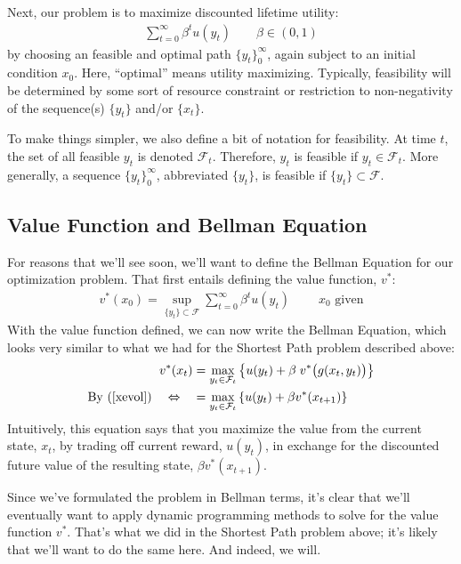 \documentclass[a4paper,12pt]{scrartcl}
\begin{document}
Next, our problem is to maximize discounted lifetime utility: 
\begin{align}
  \label{toughproblem}
  \sum^\infty_{t=0} \beta^t u(y_t)
  \qquad \beta\in (0,1)
\end{align}
by choosing an feasible and optimal path $\{ y_t \}_0^\infty$, again
subject to an initial condition $x_0$.  Here,
``optimal'' means utility maximizing. Typically, feasibility
will be determined by some sort of resource constraint or
restriction to non-negativity of the sequence(s) $\{ y_t \}$
and/or $\{x_t\}$. 

To make things simpler, we also define a bit of notation for
feasibility. At time $t$, the set of all feasible $y_t$ is denoted
$\mathcal{F}_t$. Therefore, $y_t$ is feasible if $y_t\in
\mathcal{F}_t$. More generally, a sequence $\{y_t\}^\infty_0$,
abbreviated $\{y_t\}$, is feasible if $\{y_t\} \subset \mathcal{F}$.


\subsection{Value Function and Bellman Equation}

For reasons that we'll see soon, we'll want to define the Bellman
Equation for our optimization problem. That first entails
defining the value function, $v^*$: 
\begin{align*}
  v^*(x_0) = \sup_{ \{y_t\} \subset \mathcal{F}}
  \sum^\infty_{t=0} \beta^t u(y_t)\; 
  \qquad
  \text{$x_0$ given}
\end{align*}
With the value function defined, we can now write the Bellman
Equation, which looks very similar to what we had for the Shortest
Path problem described above:
\begin{align}
  v^*(x_t) &= \max_{y_t \in \mathcal{F}_t} 
  \left\{ u(y_t) + \beta \; v^*\big(g(x_t, y_t)\big) \right\} \\
    \text{By (\ref{xevol})} \quad \Leftrightarrow \quad 
  &= \max_{y_t \in \mathcal{F}_t} 
    \left\{ u(y_t) + \beta v^*(x_{t+1}) \right\} \notag
\end{align}
Intuitively, this equation says that you maximize the value from the
current state, $x_t$, by trading off current reward, $u(y_t)$, in
exchange for the discounted future value of the resulting state,
$\beta v^*(x_{t+1})$.

Since we've formulated the problem in Bellman terms, it's clear that
we'll eventually want to apply dynamic programming methods to solve
for the value function $v^*$. That's what we did in the Shortest Path
problem above; it's likely that we'll want to do the same here.
And indeed, we will.
\end{document}
